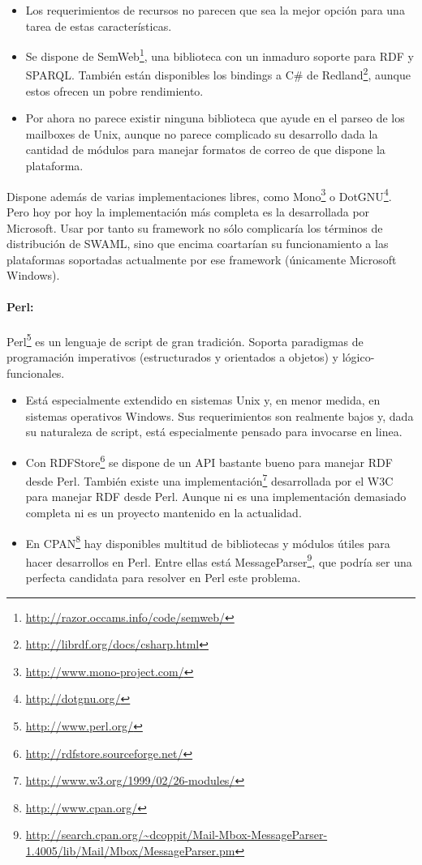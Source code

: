\begin{itemize}
  \item Los requerimientos de recursos no parecen que sea la mejor opción para una tarea
	de estas características.
  \item Se dispone de SemWeb\footnote{\url{http://razor.occams.info/code/semweb/}}, una
	biblioteca con un inmaduro soporte para RDF y SPARQL. También están disponibles los 
	bindings a C\# de Redland\footnote{\url{http://librdf.org/docs/csharp.html}}, 
	aunque estos ofrecen un pobre rendimiento.
  \item Por ahora no parece existir ninguna biblioteca que ayude en el parseo de los mailboxes 
	de Unix, aunque no parece complicado su desarrollo dada la cantidad de módulos para 
	manejar formatos de correo de que dispone la plataforma.
\end{itemize}

Dispone además de varias implementaciones libres, como 
Mono\footnote{\url{http://www.mono-project.com/}} o DotGNU\footnote{\url{http://dotgnu.org/}}.
Pero hoy por hoy la implementación más completa es la desarrollada por Microsoft. Usar por 
tanto su framework no sólo complicaría los términos de distribución de SWAML, sino que 
encima coartarían su funcionamiento a las plataformas soportadas actualmente por ese 
framework (únicamente Microsoft Windows).


\paragraph{Perl:}Perl\footnote{\url{http://www.perl.org/}} es un lenguaje de script de 
gran tradición. Soporta paradigmas de programación imperativos (estructurados y orientados 
a objetos) y lógico-funcionales.

\begin{itemize}
  \item Está especialmente extendido en sistemas Unix y, en menor medida, en sistemas
	operativos Windows. Sus requerimientos son realmente bajos y, dada su naturaleza
	de script, está especialmente pensado para invocarse en linea.
  \item Con RDFStore\footnote{\url{http://rdfstore.sourceforge.net/}} se dispone de un 
	API bastante bueno para manejar RDF desde Perl. También existe una
	implementación\footnote{\url{http://www.w3.org/1999/02/26-modules/}} 
	desarrollada por el W3C para manejar RDF desde Perl. Aunque ni es una implementación
	demasiado completa ni es un proyecto mantenido en la actualidad.
  \item En CPAN\footnote{\url{http://www.cpan.org/}} hay disponibles multitud de bibliotecas
	y módulos útiles para hacer desarrollos en Perl. Entre ellas está
	MessageParser\footnote{\url{http://search.cpan.org/~dcoppit/Mail-Mbox-MessageParser-1.4005/lib/Mail/Mbox/MessageParser.pm}},
	que podría ser una perfecta candidata para resolver en Perl este problema.
\end{itemize}

